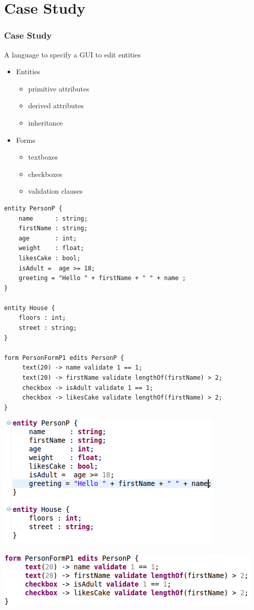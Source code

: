 \section{Case Study}

\begin{frame}
  \frametitle{Case Study}
  A language to specify a GUI to edit entities
  
  \begin{itemize}
    \item Entities
    \begin{itemize}
      \item primitive attributes
      \item derived attributes
      \item inheritance
    \end{itemize}
    \item Forms
    \begin{itemize}
      \item textboxes
      \item checkboxes
      \item validation clauses
    \end{itemize}
    
  \end{itemize}

\begin{verbatim}
entity PersonP {
	name      : string;
	firstName : string;
	age       : int; 
	weight    : float;
	likesCake : bool; 
    isAdult =  age >= 18;
	greeting = "Hello " + firstName + " " + name ;
}

entity House {
	floors : int; 
	street : string;
}

form PersonFormP1 edits PersonP {
	 text(20) -> name validate 1 == 1;
	 text(20) -> firstName validate lengthOf(firstName) > 2;
	 checkbox -> isAdult validate 1 == 1;
	 checkbox -> likesCake validate lengthOf(firstName) > 2;
}
\end{verbatim}

\includegraphics[width=\linewidth]{img/entities.png}

\includegraphics[width=\linewidth]{img/personform.png}

\end{frame}
